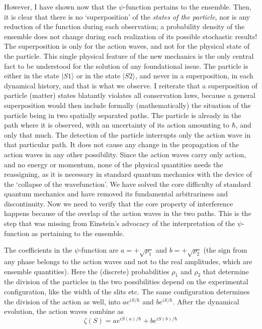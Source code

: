 However, I have shown now that the $\psi$-function pertains to the ensemble. Then, it is
clear that there is no `superposition' of the \textit{states of the particle}, nor is any reduction of
the function during each observation; a probability density of the ensemble does not change
during each realization of its possible stochastic results! The superposition is only for the
action waves, and not for the physical state of the particle. This single physical feature
of the new mechanics is the only central fact to be understood for the solution of any
foundational issue. The particle is either in the state $|S1 \rangle$ or in the state $|S2\rangle$, and never
in a superposition, in each dynamical history, and that is what we observe. I reiterate that
a superposition of particle (matter) states blatantly violates all conservation laws, because
a general superposition would then include formally (mathematically) the situation of the
particle being in two spatially separated paths. The particle is already in the path where
it is observed, with an uncertainty of its action amounting to $\hbar$, and only that much. The
detection of the particle interrupts only the action wave in that particular path. It does not
cause any change in the propagation of the action waves in any other possibility. Since the
action waves carry only action, and no energy or momentum, none of the physical quantities
needs the reassigning, as it is necessary in standard quantum mechanics with the device of
the `collapse of the wavefunction'. We have solved the core difficulty of standard quantum
mechanics and have removed its fundamental arbitrariness and discontinuity. Now we need
to verify that the core property of interference happens because of the overlap of the action
waves in the two paths. This is the step that was missing from Einstein's advocacy of the
interpretation of the $\psi$-function as pertaining to the ensemble.

The coefficients in the $\psi$-function are $a = + \sqrt{\rho_1}$ and $b = + \sqrt{\rho_2}$ (the sign from any phase
belongs to the action waves and not to the real amplitudes, which are ensemble quantities).
Here the (discrete) probabilities $\rho_1$ and $\rho_2$ that determine the division of the particles in the
two possibilities depend on the experimental configuration, like the width of the slits etc.
The same configuration determines the division of the action as well, into $ae^{iS/\hbar}$ and $be^{iS/\hbar}$.
After the dynamical evolution, the action waves combine as
\begin{equation*}
\zeta(S) = ae^{iS(a)/\hbar} + be^{iS (b)/\hbar} \tag{29}\label{c14-eq29}
\end{equation*}

